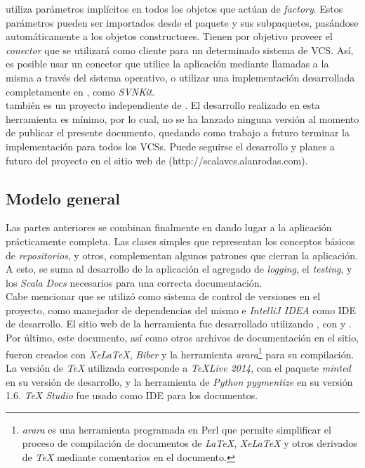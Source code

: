 \scalavcs utiliza parámetros implícitos en todos los objetos que actúan de 
\emph{factory}. Estos parámetros pueden ser importados desde el paquete
 y sus subpaquetes, pasándose 
automáticamente a los objetos constructores. Tienen por objetivo proveer el 
\emph{conector} que se utilizará como cliente para un determinado sistema de 
VCS. Así, es posible usar un conector que utilice la aplicación \svn mediante 
llamadas a la misma a través del sistema operativo, o utilizar una 
implementación desarrollada completamente en \java, como \emph{SVNKit}.\\
\scalavcs también es un proyecto independiente de \fronttier. El desarrollo 
realizado en esta herramienta es mínimo, por lo cual, no se ha lanzado ninguna 
versión al momento de publicar el presente documento, quedando como trabajo a 
futuro terminar la implementación para todos los VCSs. Puede seguirse el 
desarrollo y planes a futuro del proyecto en el sitio web de \scalavcs 
(http://scalavcs.alanrodas.com).

\subsection{Modelo general}

Las partes anteriores se combinan finalmente en \fronttier dando lugar a la 
aplicación prácticamente completa. Las clases simples que representan los 
conceptos básicos de \emph{repositorios}, \dependencies y otros, complementan 
algunos patrones que cierran la aplicación. A esto, se suma al desarrollo de la 
aplicación el agregado de \emph{logging}, el \emph{testing}, y los \emph{Scala 
Docs} necesarios para una correcta documentación.\\
Cabe mencionar que se utilizó \git como sistema de control de versiones en el 
proyecto, \sbt como manejador de dependencias del mismo e \emph{IntelliJ IDEA} 
como IDE de desarrollo. El sitio web de la herramienta fue desarrollado 
utilizando \htmlv, con \js y \css.\\
Por último, este documento, así como otros archivos de documentación en el 
sitio, fueron creados con \emph{XeLaTeX}, \emph{Biber} y la herramienta 
\emph{arara}\footnote{
	\emph{arara} es una herramienta programada en Perl que permite simplificar 
	el proceso de compilación de documentos de \emph{LaTeX}, \emph{XeLaTeX} y 
	otros derivados de \emph{TeX} mediante comentarios en el documento.
} para su compilación. La versión de \emph{TeX} utilizada corresponde a 
\emph{TeXLive 2014}, con el paquete \emph{minted} en su versión de desarrollo, 
y la herramienta de \emph{Python} \emph{pygmentize} en su versión 1.6. 
\emph{TeX Studio} fue usado como IDE para los documentos.
